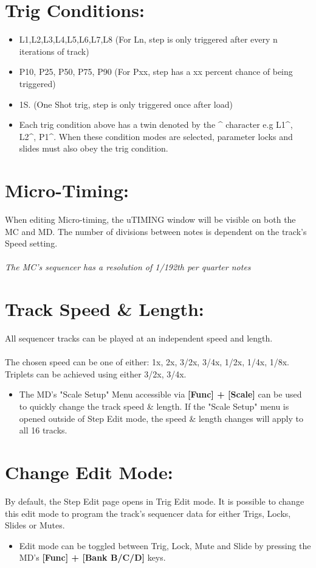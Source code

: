\section{Trig Conditions:}
\begin{itemize}
\item L1,L2,L3,L4,L5,L6,L7,L8 (For Ln, step is only triggered after every n iterations of track)
\item P10, P25, P50, P75, P90 (For Pxx, step has a xx percent chance of being triggered)
\item 1S. (One Shot trig, step is only triggered once after load)
\item Each trig condition above has a twin denoted by the \^{} character e.g L1\^{}, L2\^{}, P1\^{}. When these condition modes are selected, parameter locks and slides must also obey the trig condition.
\end{itemize}
\section{Micro-Timing:}
When editing Micro-timing, the uTIMING window will be visible on both the MC and MD. The number of divisions between notes is dependent on the track's Speed setting.\\\\\textit{The MC's sequencer has a resolution of 1/192th per quarter notes}\\
\section{Track Speed \& Length:}
All sequencer tracks can be played at an independent speed and length.\\\\
The chosen speed can be one of either: 1x, 2x, 3/2x, 3/4x, 1/2x, 1/4x, 1/8x.\\Triplets can be achieved using either 3/2x, 3/4x.
\begin{itemize}
\item The MD's "Scale Setup" Menu accessible via \textbf{[Func] + [Scale]} can be used to quickly change the track speed \& length. If the "Scale Setup" menu is opened outside of Step Edit mode, the speed \& length changes will apply to all 16 tracks.
\end{itemize}
\newpage
\section{Change Edit Mode:}
By default, the Step Edit page opens in Trig Edit mode. It is possible to change this edit mode to program the track's sequencer data for either Trigs, Locks, Slides or Mutes.
\begin{itemize}
\item Edit mode can be toggled between Trig, Lock, Mute and Slide by pressing the MD's \textbf{[Func] + [Bank B/C/D]} keys.
\end{itemize}

